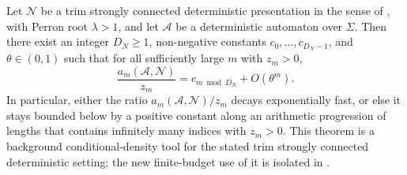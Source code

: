 \begin{theorem}
  \label{thm:parry-density}
  Let \(\mathcal N\) be a trim strongly connected deterministic
  presentation in the sense of
  , with Perron root
  \(\lambda>1\), and let
  \(\mathcal A\) be a deterministic automaton over \(\Sigma\). Then
  there exist an integer \(D_N\ge 1\), non-negative constants
  \(c_0,\dots,c_{D_N-1}\), and \(\theta\in(0,1)\) such that for all
  sufficiently large \(m\) with \(z_m>0\),
  \[
    \frac{a_m(\mathcal A,\mathcal N)}{z_m}
    =c_{m\bmod D_N}+O(\theta^m).
  \]
  In particular, either the ratio
  \(a_m(\mathcal A,\mathcal N)/z_m\) decays exponentially fast, or else
  it stays bounded below by a positive constant along an arithmetic
  progression of lengths that contains infinitely many indices with
  \(z_m>0\).
  This theorem is a background conditional-density tool for the stated
  trim strongly connected deterministic setting; the new finite-budget
  use of it is isolated in
  .
\end{theorem}

